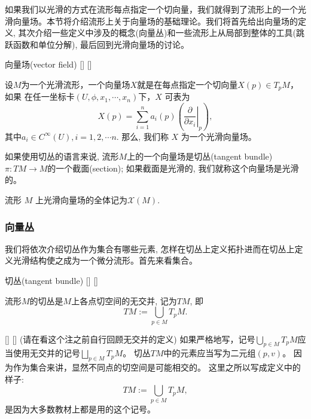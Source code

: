 \documentclass[UTF8]{ctexart}
\begin{document}
    如果我们以光滑的方式在流形每点指定一个切向量，我们就得到了流形上的一个光滑向量场。本节将介绍流形上关于向量场的基础理论。我们将首先给出向量场的定义, 其次介绍一些定义中涉及的概念(向量丛)和一些流形上从局部到整体的工具(跳跃函数和单位分解), 最后回到光滑向量场的讨论。

    \begin{dfn}
        []
        {向量场(vector field)}
        []
        []

        设$M$为一个光滑流形，一个向量场$X$就是在每点指定一个切向量$X(p) \in T_pM$，如果
        在任一坐标卡$(U,\phi,x_1,\cdots,x_n)$下，$X$ 可表为
    \[
    X(p)=\sum_{i=1}^{n} a_{i}(p)\left(\left.\frac{\partial}{\partial x_{i}}\right|_{p}\right),
    \]
    其中$a_i \in C^{\infty}(U) , i = 1,2, \cdots n$. 那么, 我们称 $X$ 为一个光滑向量场。
    
    如果使用切丛的语言来说, 流形$M$上的一个向量场是切丛(tangent bundle) $\pi : TM \rightarrow M$的一个截面(section); 如果截面是光滑的, 我们就称这个向量场是光滑的。
    
    流形 $M$ 上光滑向量场的全体记为$\mathcal{X}(M)$.
    \end{dfn}
    
    \subsubsection{向量丛}
    
    我们将依次介绍切丛作为集合有哪些元素, 怎样在切丛上定义拓扑进而在切丛上定义光滑结构使之成为一个微分流形。首先来看集合。
    
    \begin{dfn}
        []
        {切丛(tangent bundle)}
        []
        []

        流形$M$的切丛是$M$上各点切空间的无交并, 记为$TM$, 即
        \[
            TM := \displaystyle\bigcup_{p \in M} T_p M.
        \]
    \end{dfn}

    \begin{rmk}
        []
        {}
        []
        []
        (请在看这个注之前自行回顾无交并的定义)
        如果严格地写，记号$\displaystyle\bigcup_{p \in M} T_p M$应当使用无交并的记号$\displaystyle\bigsqcup_{p \in M} T_p M$。 
        切丛$T M$中的元素应当写为二元组$(p, v)$。
        因为作为集合来讲，显然不同点的切空间是可能相交的。
        这里之所以写成定义中的样子:
        \[
             TM := \displaystyle\bigcup_{p \in M} T_p M,
        \]
        是因为大多数教材上都是用的这个记号。
    \end{rmk}
\end{document}
